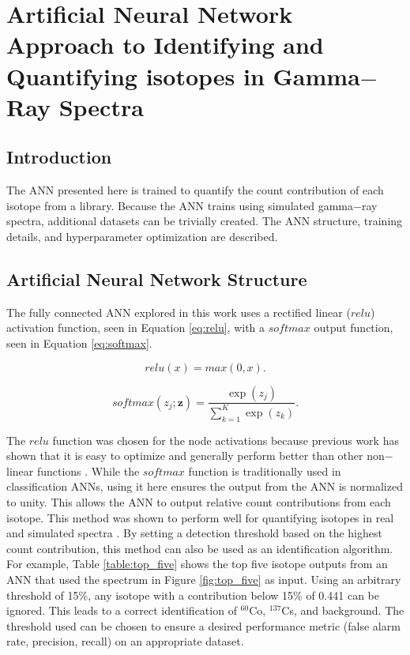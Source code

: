 \documentclass[tocnosub,noragright,centerchapter,12pt,fullpage]{uiucecethesis09}
\begin{document}
\chapter{Artificial Neural Network Approach to Identifying and Quantifying isotopes in Gamma$-$Ray Spectra}


\section{Introduction}

The ANN presented here is trained to quantify the count contribution of each isotope from a library. Because the ANN trains using simulated gamma$-$ray spectra, additional datasets can be trivially created. The ANN structure, training details, and hyperparameter optimization are described. 


\section{Artificial Neural Network Structure}

The fully connected ANN explored in this work uses a rectified linear ($relu$) activation function, seen in Equation \ref{eq:relu}, with a $softmax$ output function, seen in Equation \ref{eq:softmax}.

\begin{equation} \label{eq:relu}
relu(x) = max(0,x).
\end{equation}

\begin{equation} \label{eq:softmax}
softmax(z_j ; \boldsymbol{z}) = \frac{\exp(z_j)} {\sum_{k=1}^{K} \exp(z_k)}.
\end{equation} 

The $relu$ function was chosen for the node activations because previous work has shown that it is easy to optimize and generally perform better than other non$-$linear functions \cite[pg. 189]{Goodfellow-et-al-2016}. While the $softmax$ function is traditionally used in classification ANNs, using it here ensures the output from the ANN is normalized to unity. This allows the ANN to output relative count contributions from each isotope. This method was shown to perform well for quantifying isotopes in real and simulated spectra \cite{kamudaThesis2017,kamuda2017}. By setting a detection threshold based on the highest count contribution, this method can also be used as an identification algorithm. For example, Table \ref{table:top_five} shows the top five isotope outputs from an ANN that used the spectrum in Figure \ref{fig:top_five} as input. Using an arbitrary threshold of 15\%, any isotope with a contribution below 15\% of 0.441 can be ignored. This leads to a correct identification of $^{60}$Co, $^{137}$Cs, and background. The threshold used can be chosen to ensure a desired performance metric (false alarm rate, precision, recall) on an appropriate dataset. 
\end{document}
